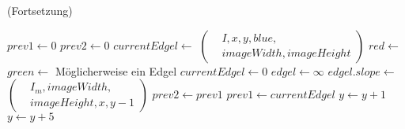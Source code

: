 \begin{algorithm}[!ht]
\caption{ (Fortsetzung)}
\label{alg:findedgelshirzer-2}
	\begin{algorithmic}[1]
			\State $\mathit{prev1} \gets 0$
			\State $\mathit{prev2} \gets 0$
				\State $\mathit{currentEdgel} \gets$ 
				$\left(
				\begin{aligned}
					& I,x,y,\mathit{blue},\\
					& \mathit{imageWidth},\mathit{imageHeight}
				\end{aligned}\right)$
				\label{alg:findedgelshirzer-2-color-start}
				\State $\mathit{red} \gets$ 
				\State $\mathit{green} \gets$ 
				\label{alg:findedgelshirzer-2-color-end}
					\State Möglicherweise ein Edgel
				\Else
					\State $\mathit{currentEdgel} \gets 0$
				\EndIf
				\State $\mathit{edgel} \gets \infty$
				\State {}
				\State $\mathit{edgel.slope} \gets$ 
					$\left(
					\begin{aligned}
						& I_m, \mathit{imageWidth},\\
						& \mathit{imageHeight}, x,y - 1
					\end{aligned}\right)$
				\State {}
				\EndIf
				\State $\mathit{prev2} \gets \mathit{prev1}$
				\State $\mathit{prev1} \gets \mathit{currentEdgel}$
				\State $y \gets y + 1$
			\EndFor
			\State $y \gets y + 5$
		\EndFor
	\end{algorithmic}
\end{algorithm}
